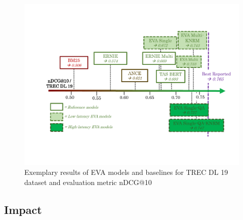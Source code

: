 \begin{figure}[!htb]
    \includegraphics[trim={1.5cm 3cm 0.7cm 3cm}, clip, width=\textwidth]{resources/results} 
    \caption{Exemplary results of EVA models and baselines for TREC DL 19 dataset and evaluation metric nDCG@10}
    \label{fig:results}
\end{figure}

\subsection{Impact}\label{subsec:outcomes}

